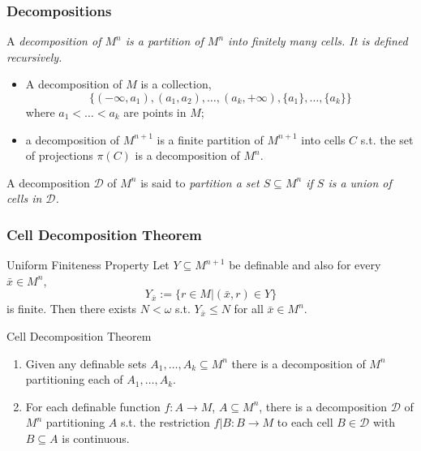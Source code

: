 \begin{frame}[c]\frametitle{Decompositions}
    
	A \em decomposition \em of $M^n$ is a partition of $M^n$ into finitely many cells. It is defined recursively.

	\begin{itemize}
		\item A decomposition of $M$ is a collection,
		$$\{  (-\infty,a_1),(a_1,a_2),\ldots,(a_k,+\infty),\{a_1\},\ldots,\{a_k\} \}$$
		where $a_1<\ldots<a_k$ are points in $M$;
		\item a decomposition of $M^{n+1}$ is a finite partition of $M^{n+1}$ into cells $C$ s.t. the set of projections $\pi(C)$ is a decomposition of $M^n$.
	\end{itemize}

	A decomposition $\mathcal{D}$ of $M^n$ is said to \em partition \em a set $S \subseteq M^n$ if $S$ is a union of cells in $\mathcal{D}$.

\end{frame}

\begin{frame}[c]\frametitle{Cell Decomposition Theorem}
    
	\begin{beamerboxesrounded}[shadow=true]{Uniform Finiteness Property \citep{knight1986definable}}
		Let $Y \subseteq M^{n+1}$ be definable and also for every $\bar{x} \in M^n$, 
		$$Y_{\bar{x}}:= \{  r \in M | (\bar{x},r) \in Y \}$$ is finite.
		Then there exists $N<\omega$ s.t. $Y_{\bar{x}} \leq N$ for all $\bar{x} \in M^n$.
	\end{beamerboxesrounded}

	\begin{beamerboxesrounded}[shadow=true]{Cell Decomposition Theorem \citep{knight1986definable}}
		\begin{enumerate}
			\item Given any definable sets $A_1,\ldots,A_k\subseteq M^n$ there is a decomposition of $M^n$ partitioning each of $A_1,\ldots,A_k$.
			\item For each definable function $f:A \to M$, $A \subseteq M^n$, there is a decomposition $\mathcal{D}$ of $M^n$ partitioning $A$ s.t. the restriction $f|B:B\to M$ to each cell $B \in \mathcal{D}$ with $B\subseteq A$ is continuous.
		\end{enumerate}
	\end{beamerboxesrounded}

\end{frame}

